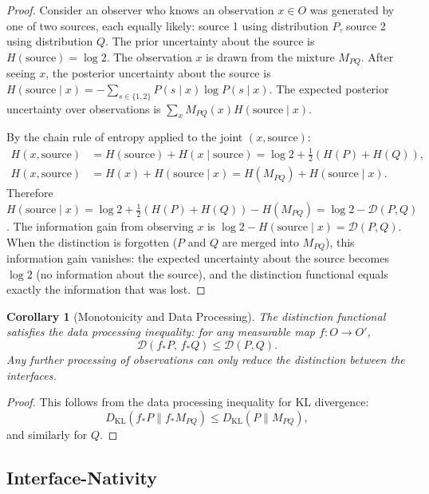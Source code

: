 \documentclass[12pt,a4paper]{article}
\newtheorem{corollary}[theorem]{Corollary}
\theoremstyle{remark}
\theoremstyle{definition}
\begin{document}
\begin{proof}
Consider an observer who knows an observation $x \in O$ was generated by
one of two sources, each equally likely: source 1 using distribution $P$,
source 2 using distribution $Q$. The prior uncertainty about the source is
$H(\text{source}) = \log 2$. The observation $x$ is drawn from the mixture
$M_{PQ}$. After seeing $x$, the posterior uncertainty about the source is
$H(\text{source} \mid x) = -\sum_{s \in \{1,2\}} P(s \mid x) \log P(s\mid x)$.
The expected posterior uncertainty over observations is
$\sum_x M_{PQ}(x) H(\text{source} \mid x)$.

By the chain rule of entropy applied to the joint $(x, \text{source})$:
\begin{align*}
  H(x, \text{source})
  &= H(\text{source}) + H(x \mid \text{source})
   = \log 2 + \frac{1}{2}(H(P) + H(Q)), \\
  H(x, \text{source})
  &= H(x) + H(\text{source} \mid x)
   = H(M_{PQ}) + H(\text{source} \mid x).
\end{align*}
Therefore $H(\text{source} \mid x) = \log 2 + \frac{1}{2}(H(P)+H(Q)) - H(M_{PQ})
= \log 2 - \mathcal{D}(P,Q)$. The information gain from observing $x$ is
$\log 2 - H(\text{source}\mid x) = \mathcal{D}(P,Q)$. When the distinction
is forgotten ($P$ and $Q$ are merged into $M_{PQ}$), this information
gain vanishes: the expected uncertainty about the source becomes $\log 2$
(no information about the source), and the distinction functional equals
exactly the information that was lost.
\end{proof}

\begin{corollary}[Monotonicity and Data Processing]
\label{cor:data_proc}
The distinction functional satisfies the data processing inequality: for
any measurable map $f : O \to O'$,
\begin{equation}
  \mathcal{D}(f_*P,\, f_*Q) \leq \mathcal{D}(P,Q).
\end{equation}
Any further processing of observations can only reduce the distinction
between the interfaces.
\end{corollary}

\begin{proof}
This follows from the data processing inequality for KL divergence:
\[D_{\mathrm{KL}}(f_*P \| f_*M_{PQ}) \leq D_{\mathrm{KL}}(P \| M_{PQ}),\]
and similarly for $Q$.
\end{proof}

\subsection{Interface-Nativity}
\end{document}
